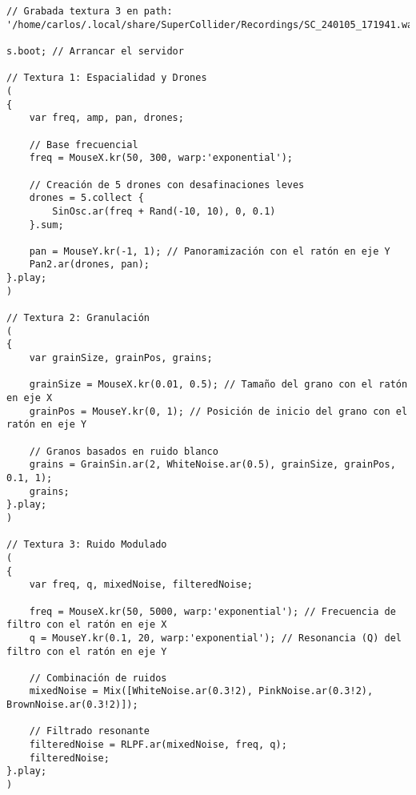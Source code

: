 \begin{minipage}[t]{1\textwidth}
    \centering
    \begin{lstlisting}[style=SuperCollider-IDE, basicstyle=\footnotesize\ttfamily, numbers=none]
// Grabada textura 3 en path: '/home/carlos/.local/share/SuperCollider/Recordings/SC_240105_171941.wav'

s.boot; // Arrancar el servidor

// Textura 1: Espacialidad y Drones
(
{
    var freq, amp, pan, drones;

    // Base frecuencial
    freq = MouseX.kr(50, 300, warp:'exponential');

    // Creación de 5 drones con desafinaciones leves
    drones = 5.collect {
        SinOsc.ar(freq + Rand(-10, 10), 0, 0.1)
    }.sum;

    pan = MouseY.kr(-1, 1); // Panoramización con el ratón en eje Y
    Pan2.ar(drones, pan);
}.play;
)

// Textura 2: Granulación
(
{
    var grainSize, grainPos, grains;

    grainSize = MouseX.kr(0.01, 0.5); // Tamaño del grano con el ratón en eje X
    grainPos = MouseY.kr(0, 1); // Posición de inicio del grano con el ratón en eje Y

    // Granos basados en ruido blanco
    grains = GrainSin.ar(2, WhiteNoise.ar(0.5), grainSize, grainPos, 0.1, 1);
    grains;
}.play;
)

// Textura 3: Ruido Modulado
(
{
    var freq, q, mixedNoise, filteredNoise;

    freq = MouseX.kr(50, 5000, warp:'exponential'); // Frecuencia de filtro con el ratón en eje X
    q = MouseY.kr(0.1, 20, warp:'exponential'); // Resonancia (Q) del filtro con el ratón en eje Y

    // Combinación de ruidos
    mixedNoise = Mix([WhiteNoise.ar(0.3!2), PinkNoise.ar(0.3!2), BrownNoise.ar(0.3!2)]);

    // Filtrado resonante
    filteredNoise = RLPF.ar(mixedNoise, freq, q);
    filteredNoise;
}.play;
)                       
    \end{lstlisting}
    \vspace{1cm}
\end{minipage}




















